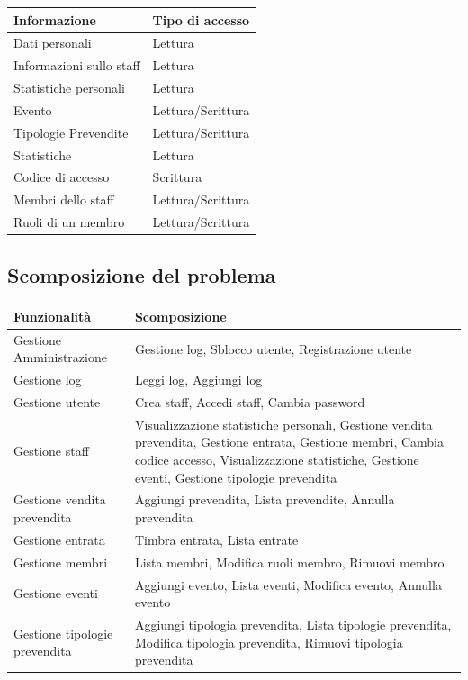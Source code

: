 \documentclass[a4paper]{article}
\begin{document}
\begin{center}
    \begin{tabularx}{1\textwidth}{|X|X|}
    \hline
    \textbf{Informazione} & \textbf{Tipo di accesso} \\
    \hline
    \hline
    Dati personali & Lettura\\
    \hline
    Informazioni sullo staff & Lettura\\
    \hline
    Statistiche personali & Lettura\\
    \hline
    Evento & Lettura/Scrittura\\
    \hline
    Tipologie Prevendite & Lettura/Scrittura\\
    \hline
    Statistiche & Lettura\\
    \hline
    Codice di accesso & Scrittura\\
    \hline
    Membri dello staff & Lettura/Scrittura\\
    \hline
    Ruoli di un membro & Lettura/Scrittura\\
    \hline
    \end{tabularx}
\end{center}

\newpage

\subsection{Scomposizione del problema}

\begin{center}
    \begin{tabularx}{1\textwidth}{|X|X|}
    \hline
    \textbf{Funzionalità} & \textbf{Scomposizione} \\
    \hline
    \hline
    Gestione Amministrazione & Gestione log, Sblocco utente, Registrazione utente\\
    \hline
    Gestione log & Leggi log, Aggiungi log\\
    \hline
    Gestione utente & Crea staff, Accedi staff, Cambia password\\
    \hline
    Gestione staff & Visualizzazione statistiche personali, Gestione vendita prevendita, Gestione entrata, Gestione membri, Cambia codice accesso, Visualizzazione statistiche, Gestione eventi, Gestione tipologie prevendita\\
    \hline
    Gestione vendita prevendita & Aggiungi prevendita, Lista prevendite, Annulla prevendita\\
    \hline
    Gestione entrata & Timbra entrata, Lista entrate\\
    \hline
    Gestione membri & Lista membri, Modifica ruoli membro, Rimuovi membro\\
    \hline
    Gestione eventi & Aggiungi evento, Lista eventi, Modifica evento, Annulla evento\\
    \hline
    Gestione tipologie prevendita & Aggiungi tipologia prevendita, Lista tipologie prevendita, Modifica tipologia prevendita, Rimuovi tipologia prevendita\\
    \hline
    \end{tabularx}
\end{center}
\end{document}

